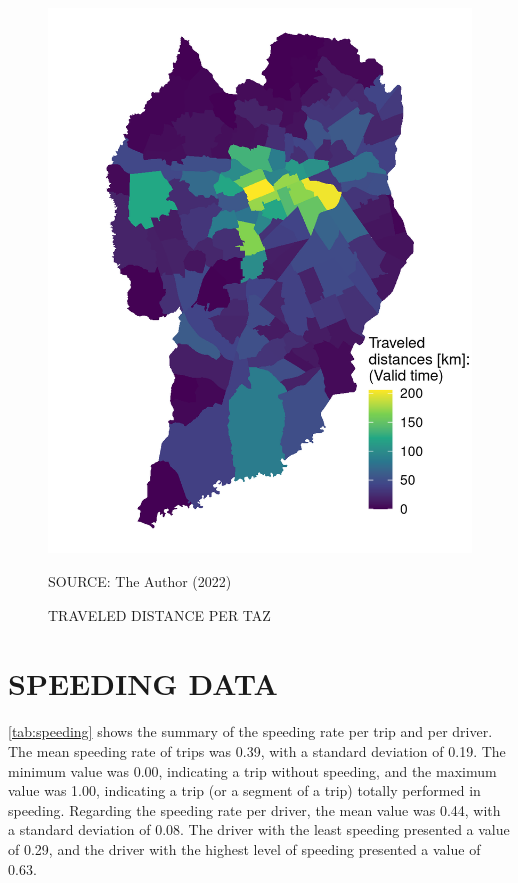 \begin{figure}[!htbp]
    \centering\footnotesize
    \captionsetup{font=footnotesize}
    \caption{TRAVELED DISTANCE PER TAZ}
    \includegraphics{fig/taz_dist.png}
    \label{fig:taz_travel}
    \par SOURCE: The Author (2022)
\end{figure}

\section{SPEEDING DATA} \label{sec:spr}


\autoref{tab:speeding} shows the summary of the speeding rate per trip and per driver. The mean speeding rate of trips was 0.39, with a standard deviation of 0.19. The minimum value was 0.00, indicating a trip without speeding, and the maximum value was 1.00, indicating a trip (or a segment of a trip) totally performed in speeding. Regarding the speeding rate per driver, the mean value was 0.44, with a standard deviation of 0.08. The driver with the least speeding presented a value of 0.29, and the driver with the highest level of speeding presented a value of 0.63.

